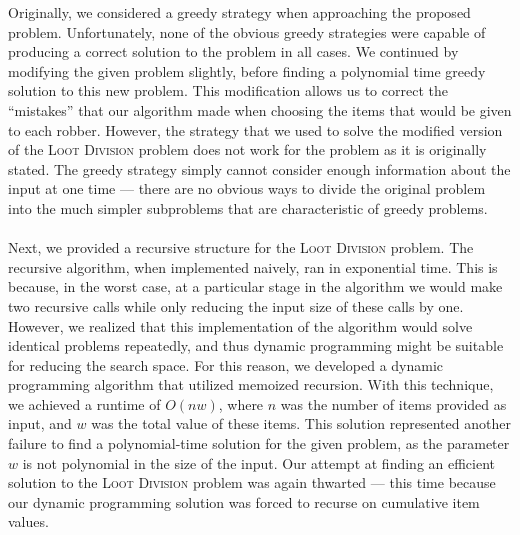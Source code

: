 \documentclass{article}
\begin{document}
Originally, we considered a greedy strategy when approaching the proposed problem. Unfortunately, none of the obvious greedy strategies were capable of producing a correct solution to the problem in all cases. We continued by modifying the given problem slightly, before finding a polynomial time greedy solution to this new problem. This modification allows us to correct the ``mistakes'' that our algorithm made when choosing the items that would be given to each robber. However, the strategy that we used to solve the modified version of the \textsc{Loot Division} problem does not work for the problem as it is originally stated. The greedy strategy simply cannot consider enough information about the input at one time --- there are no obvious ways to divide the original problem into the much simpler subproblems that are characteristic of greedy problems. \\ \\
Next, we provided a recursive structure for the \textsc{Loot Division} problem. The recursive algorithm, when implemented naively, ran in exponential time. This is because, in the worst case, at a particular stage in the algorithm we would make two recursive calls while only reducing the input size of these calls by one. However, we realized that this implementation of the algorithm would solve identical problems repeatedly, and thus dynamic programming might be suitable for reducing the search space. For this reason, we developed a dynamic programming algorithm that utilized memoized recursion. With this technique, we achieved a runtime of $O(nw)$, where $n$ was the number of items provided as input, and $w$ was the total value of these items. This solution represented another failure to find a polynomial-time solution for the given problem, as the parameter $w$ is not polynomial in the size of the input. Our attempt at finding an efficient solution to the \textsc{Loot Division} problem was again thwarted --- this time because our dynamic programming solution was forced to recurse on cumulative item values. \\ \\
\end{document}
